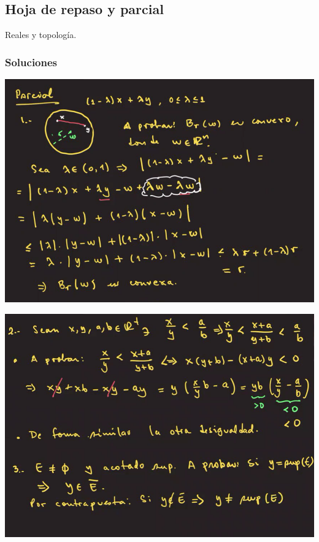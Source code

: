 \subsection{Hoja de repaso y parcial}

Reales y topología. 




\subsubsection{Soluciones}

\begin{center}
	\includegraphics[scale=0.45]{images/2/28}
\end{center}
\begin{center}
	\includegraphics[scale=0.45]{images/2/29}
\end{center}

